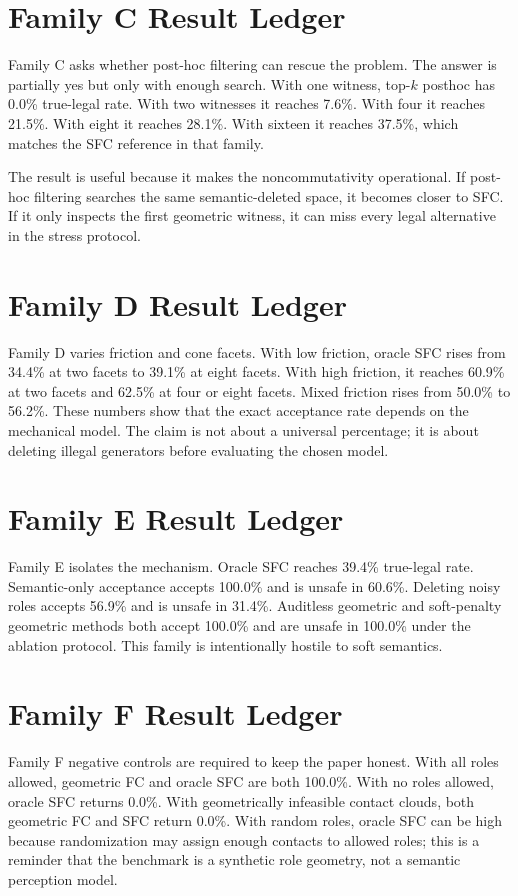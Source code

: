 \documentclass{article}
\begin{document}
\section{Family C Result Ledger}

Family C asks whether post-hoc filtering can rescue the problem. The answer is partially yes but only with enough search. With one witness, top-\(k\) posthoc has 0.0\% true-legal rate. With two witnesses it reaches 7.6\%. With four it reaches 21.5\%. With eight it reaches 28.1\%. With sixteen it reaches 37.5\%, which matches the SFC reference in that family.

The result is useful because it makes the noncommutativity operational. If post-hoc filtering searches the same semantic-deleted space, it becomes closer to SFC. If it only inspects the first geometric witness, it can miss every legal alternative in the stress protocol.

\section{Family D Result Ledger}

Family D varies friction and cone facets. With low friction, oracle SFC rises from 34.4\% at two facets to 39.1\% at eight facets. With high friction, it reaches 60.9\% at two facets and 62.5\% at four or eight facets. Mixed friction rises from 50.0\% to 56.2\%. These numbers show that the exact acceptance rate depends on the mechanical model. The claim is not about a universal percentage; it is about deleting illegal generators before evaluating the chosen model.

\section{Family E Result Ledger}

Family E isolates the mechanism. Oracle SFC reaches 39.4\% true-legal rate. Semantic-only acceptance accepts 100.0\% and is unsafe in 60.6\%. Deleting noisy roles accepts 56.9\% and is unsafe in 31.4\%. Auditless geometric and soft-penalty geometric methods both accept 100.0\% and are unsafe in 100.0\% under the ablation protocol. This family is intentionally hostile to soft semantics.

\section{Family F Result Ledger}

Family F negative controls are required to keep the paper honest. With all roles allowed, geometric FC and oracle SFC are both 100.0\%. With no roles allowed, oracle SFC returns 0.0\%. With geometrically infeasible contact clouds, both geometric FC and SFC return 0.0\%. With random roles, oracle SFC can be high because randomization may assign enough contacts to allowed roles; this is a reminder that the benchmark is a synthetic role geometry, not a semantic perception model.
\end{document}
